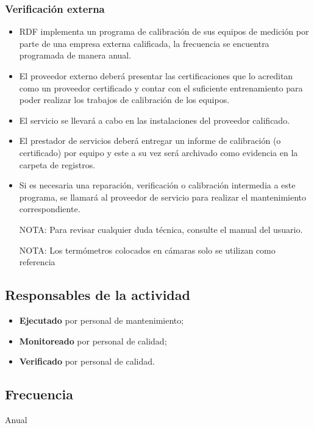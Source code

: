 \subsubsection{Verificación externa}
\begin{itemize}
	\item \Gls{RDF} implementa un programa de calibración de sus equipos de medición por parte de una empresa externa calificada, la frecuencia se encuentra programada de manera anual.
	\item El \gls{proveedor} externo deberá presentar las certificaciones que lo acreditan como un proveedor certificado y contar con el suficiente entrenamiento para poder realizar los trabajos de calibración de los equipos.
	\item El servicio se llevará a cabo en las instalaciones del proveedor calificado.
	\item El prestador de servicios deberá entregar un informe de calibración (o certificado) por equipo y este a su vez será archivado como evidencia en la carpeta de registros.
	\item Si es necesaria una reparación, verificación o calibración intermedia a este programa, se llamará al proveedor de servicio para realizar el mantenimiento correspondiente.
    \item[NOTA:] Para revisar cualquier duda técnica, consulte el manual del usuario.
\item[NOTA:] Los termómetros colocados en cámaras solo se utilizan como referencia
\end{itemize}

\subsection{Responsables de la actividad}
\begin{itemize}
	\item \textbf{Ejecutado} por personal de mantenimiento;
	\item \textbf{Monitoreado} por personal de calidad;
	\item \textbf{Verificado} por personal de calidad.
\end{itemize}

\subsection{Frecuencia}
Anual

